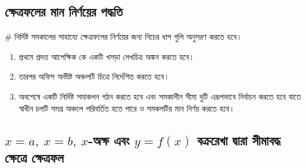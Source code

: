 \subsection{ ক্ষেত্রফলের মান নির্ণয়ের পদ্ধতি }


# নির্দিষ্ট সমকালের সাহায্যে ক্ষেত্রফলের নির্ণয়ের জন্য নিচের ধাপ গুলি অনুসরণ করতে হবে। 

\begin{enumerate}
    \item প্রথমে প্রদত্ত আপেক্ষিক কে একটি খসড়া লেখচিত্র অঙ্কন করতে হবে।
    \item তারপর অফিস অভীষ্ট অঞ্চলটি চিত্রে নির্দেশিত করতে হবে।
    \item অবশেষে একটি নির্দিষ্ট সমাকলন গঠন করতে হবে এবং সমকালীন সীমা দুটি এরূপভাবে নির্বাচন করতে হবে যাতে স্বাধীন চলটি সমগ্র অঞ্চলে পরিবর্তিত হতে পারে ও সমকলটির মান নির্ণয় করতে হবে।

\end{enumerate}



\subsection{ $x = a,\: x = b,\: x$-অক্ষ এবং $y = f(x)$ বক্ররেখা দ্বারা সীমাবদ্ধ ক্ষেত্রে ক্ষেত্রফল}

